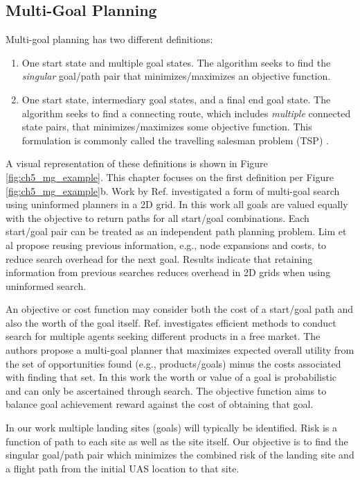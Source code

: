 \subsection{Multi-Goal Planning}\label{sec:ch5_multi_goal_bg}

Multi-goal planning has two different  definitions:
\begin{enumerate}
    \item One start state and multiple goal states. The algorithm seeks to find the \emph{singular} goal/path pair that minimizes/maximizes an objective function.
    \item One start state, intermediary goal states, and a final end goal state. The algorithm seeks to find a connecting route, which includes \emph{multiple} connected state pairs, that minimizes/maximizes some objective function. This formulation is commonly called the travelling salesman problem (TSP) \cite{saha_planning_2003}.
\end{enumerate}
A visual representation of these definitions is shown in Figure \ref{fig:ch5_mg_example}. This chapter focuses on the first definition per Figure \ref{fig:ch5_mg_example}b.  Work by Ref. \cite{lim_uninformed_2014} investigated a form of multi-goal search using uninformed planners in a 2D grid. In this work all goals are valued equally with the objective to return paths for all start/goal combinations. Each start/goal pair can be treated as an independent path planning problem. Lim et al propose reusing previous information, e.g.,  node expansions and costs, to reduce search overhead for the next goal. Results indicate that retaining information from previous searches reduces overhead in 2D grids when using uninformed search.

An objective or cost function may consider both the cost of a start/goal path and also the worth of the goal itself. Ref. \cite{sarne_multi-goal_2010} investigates efficient methods to conduct search for multiple agents seeking different products in a free market.  The authors propose a multi-goal planner that maximizes expected overall utility from the set of opportunities found (e.g., products/goals) minus the costs associated with finding that set. In this work the worth or value of a goal is probabilistic and can only be ascertained through search. The objective function aims to balance goal achievement reward against the cost of obtaining that goal.

In our work multiple landing sites (goals) will typically be identified. Risk is a function of path to each site as well as the site itself. Our objective is to find the singular goal/path pair which minimizes the combined risk of the landing site and a flight path from the initial UAS location to that site. 

